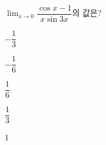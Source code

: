 $\displaystyle\lim_{x\to 0}\dfrac{\cos x-1}{x\sin 3x}$의 값은?
\begin{choices32}{\rule[-3ex]{0pt}{8ex}$-\dfrac{1}{3}$}{\rule[-3ex]{0pt}{8ex}$-\dfrac{1}{6}$}{\rule[-3ex]{0pt}{8ex}$\dfrac{1}{6}$}{\rule[-3ex]{0pt}{8ex}$\dfrac{1}{3}$}{\rule[-3ex]{0pt}{8ex}$1$}\end{choices32}
